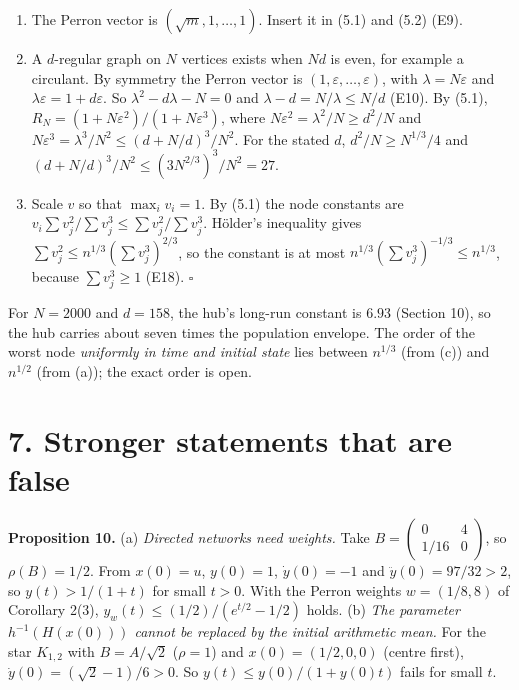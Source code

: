 \documentclass[
  11pt,
  a4paper,
]{article}
\begin{document}
\begin{enumerate}
\def\labelenumi{(\alph{enumi})}
\setcounter{enumi}{1}
\item
  The Perron vector is \((\sqrt m,1,\dots,1)\). Insert it in (5.1) and
  (5.2) (E9).
\item
  A \(d\)-regular graph on \(N\) vertices exists when \(Nd\) is even,
  for example a circulant. By symmetry the Perron vector is
  \((1,\varepsilon,\dots,\varepsilon)\), with \(\lambda=N\varepsilon\)
  and \(\lambda\varepsilon=1+d\varepsilon\). So
  \(\lambda^2-d\lambda-N=0\) and \(\lambda-d=N/\lambda\le N/d\) (E10).
  By (5.1), \(R_N=(1+N\varepsilon^2)/(1+N\varepsilon^3)\), where
  \(N\varepsilon^2=\lambda^2/N\ge d^2/N\) and
  \(N\varepsilon^3=\lambda^3/N^2\le(d+N/d)^3/N^2\). For the stated
  \(d\), \(d^2/N\ge N^{1/3}/4\) and
  \((d+N/d)^3/N^2\le(3N^{2/3})^3/N^2=27\).
\item
  Scale \(v\) so that \(\max_iv_i=1\). By (5.1) the node constants are
  \(v_i\sum v_j^2/\sum v_j^3\le\sum v_j^2/\sum v_j^3\). Hölder's
  inequality gives \(\sum v_j^2\le n^{1/3}(\sum v_j^3)^{2/3}\), so the
  constant is at most \(n^{1/3}(\sum v_j^3)^{-1/3}\le n^{1/3}\), because
  \(\sum v_j^3\ge1\) (E18). \(\square\)
\end{enumerate}

For \(N=2000\) and \(d=158\), the hub's long-run constant is \(6.93\)
(Section 10), so the hub carries about seven times the population
envelope. The order of the worst node \emph{uniformly in time and
initial state} lies between \(n^{1/3}\) (from (c)) and \(n^{1/2}\) (from
(a)); the exact order is open.

\section{7. Stronger statements that are
false}\label{stronger-statements-that-are-false}

\textbf{Proposition 10.} (a) \emph{Directed networks need weights.} Take
\(B=\begin{pmatrix}0&4\\1/16&0\end{pmatrix}\), so \(\rho(B)=1/2\). From
\(x(0)=u\), \(y(0)=1\), \(\dot y(0)=-1\) and \(\ddot y(0)=97/32>2\), so
\(y(t)>1/(1+t)\) for small \(t>0\). With the Perron weights
\(w=(1/8,8)\) of Corollary 2(3), \(y_w(t)\le(1/2)/(e^{t/2}-1/2)\) holds.
(b) \emph{The parameter \(h^{-1}(H(x(0)))\) cannot be replaced by the
initial arithmetic mean.} For the star \(K_{1,2}\) with \(B=A/\sqrt2\)
(\(\rho=1\)) and \(x(0)=(1/2,0,0)\) (centre first),
\(\dot y(0)=(\sqrt2-1)/6>0\). So \(y(t)\le y(0)/(1+y(0)t)\) fails for
small \(t\).
\end{document}
